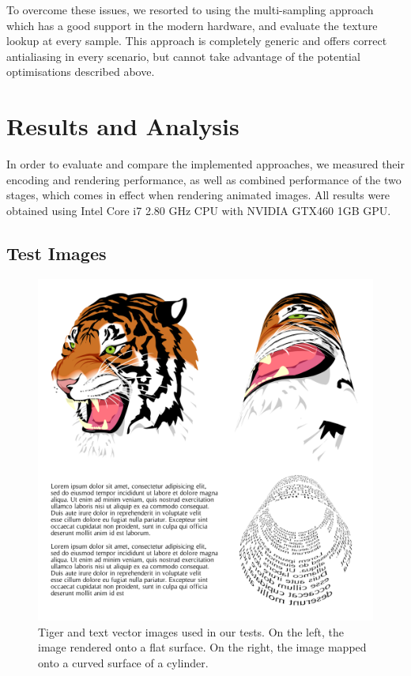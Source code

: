 \documentclass[11pt,a4paper,twoside]{article}
\begin{document}
To overcome these issues, we resorted to using the multi-sampling approach which has a good support in the modern hardware, and evaluate the texture lookup at every sample. This approach is completely generic and offers correct antialiasing in every scenario, but cannot take advantage of the potential optimisations described above.

\section {Results and Analysis}

In order to evaluate and compare the implemented approaches, we measured their encoding and rendering performance, as well as combined performance of the two stages, which comes in effect when rendering animated images. All results were obtained using Intel Core i7 2.80 GHz CPU with NVIDIA GTX460 1GB GPU.


\subsection {Test Images}

\begin {figure} [b!]
	\centering
	\includegraphics[width=0.8\columnwidth] {figures/screenshots}
	\caption {Tiger and text vector images used in our tests. On the left, the image rendered onto a flat surface. On the right, the image mapped onto a curved surface of a cylinder.}
	\label {fig:screenshots}
\end {figure}
\end{document}
